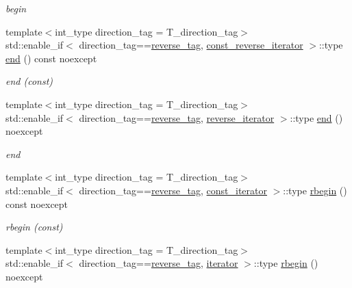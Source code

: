 \begin{DoxyCompactItemize}
\begin{DoxyCompactList}\small\item\em begin \end{DoxyCompactList}\item 
{\footnotesize template$<$int\+\_\+type direction\+\_\+tag = T\+\_\+direction\+\_\+tag$>$ }\\std\+::enable\+\_\+if$<$ direction\+\_\+tag==\hyperlink{namespaceIceBRG_a3f2c2517005b9902e3eb97894b072f91a9793d1e2c6b63e17ed62034e78307b63}{reverse\+\_\+tag}, \hyperlink{classIceBRG_1_1labeled__array__vecs_aefecf82bcd5d24b2c6fc29b4f8930054}{const\+\_\+reverse\+\_\+iterator} $>$\+::type \hyperlink{classIceBRG_1_1labeled__array__vecs_ae465f0c700df40b9b812dac7e5d36551}{end} () const  noexcept
\begin{DoxyCompactList}\small\item\em end (const) \end{DoxyCompactList}\item 
{\footnotesize template$<$int\+\_\+type direction\+\_\+tag = T\+\_\+direction\+\_\+tag$>$ }\\std\+::enable\+\_\+if$<$ direction\+\_\+tag==\hyperlink{namespaceIceBRG_a3f2c2517005b9902e3eb97894b072f91a9793d1e2c6b63e17ed62034e78307b63}{reverse\+\_\+tag}, \hyperlink{classIceBRG_1_1labeled__array__vecs_ab3d90428e6ba03e8a3bcb3b44629e3f5}{reverse\+\_\+iterator} $>$\+::type \hyperlink{classIceBRG_1_1labeled__array__vecs_a1561f5d623f9a85a67611c3639030759}{end} () noexcept
\begin{DoxyCompactList}\small\item\em end \end{DoxyCompactList}\item 
{\footnotesize template$<$int\+\_\+type direction\+\_\+tag = T\+\_\+direction\+\_\+tag$>$ }\\std\+::enable\+\_\+if$<$ direction\+\_\+tag==\hyperlink{namespaceIceBRG_a3f2c2517005b9902e3eb97894b072f91a9793d1e2c6b63e17ed62034e78307b63}{reverse\+\_\+tag}, \hyperlink{classIceBRG_1_1labeled__array__vecs_a6003abed56d6f931ce74524cda329972}{const\+\_\+iterator} $>$\+::type \hyperlink{classIceBRG_1_1labeled__array__vecs_a7dc0b675a7fc85d2c7a98e750b70f7bc}{rbegin} () const  noexcept
\begin{DoxyCompactList}\small\item\em rbegin (const) \end{DoxyCompactList}\item 
{\footnotesize template$<$int\+\_\+type direction\+\_\+tag = T\+\_\+direction\+\_\+tag$>$ }\\std\+::enable\+\_\+if$<$ direction\+\_\+tag==\hyperlink{namespaceIceBRG_a3f2c2517005b9902e3eb97894b072f91a9793d1e2c6b63e17ed62034e78307b63}{reverse\+\_\+tag}, \hyperlink{classIceBRG_1_1labeled__array__vecs_a989cbe0a7bc0b96a206c52ddd3513a23}{iterator} $>$\+::type \hyperlink{classIceBRG_1_1labeled__array__vecs_ad374db7356fdca78708d5d187f35ad71}{rbegin} () noexcept

\end{DoxyCompactItemize}

